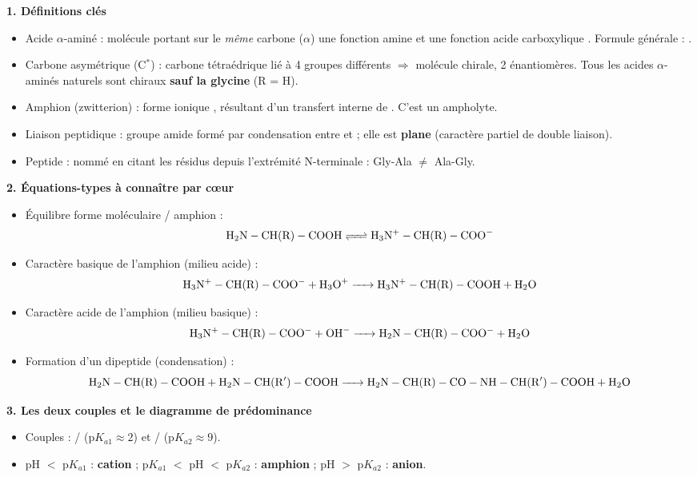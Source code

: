 \documentclass[11pt]{article}
\newcommand{\cle}[1]{{\popxbold\color{popdark}#1}}
\begin{document}
\begin{bilan}
\textbf{1. Définitions clés}
\begin{itemize}
  \item \cle{Acide $\alpha$-aminé} : molécule portant sur le \emph{même} carbone ($\alpha$) une fonction amine  et une fonction acide carboxylique . Formule générale : .
  \item \cle{Carbone asymétrique} (C$^*$) : carbone tétraédrique lié à 4 groupes différents $\Rightarrow$ molécule chirale, 2 énantiomères. Tous les acides $\alpha$-aminés naturels sont chiraux \textbf{sauf la glycine} (R = H).
  \item \cle{Amphion} (zwitterion) : forme ionique , résultant d'un transfert interne de . C'est un \cle{ampholyte}.
  \item \cle{Liaison peptidique} : groupe amide  formé par condensation entre  et  ; elle est \textbf{plane} (caractère partiel de double liaison).
  \item \cle{Peptide} : nommé en citant les résidus depuis l'extrémité N-terminale : Gly-Ala $\neq$ Ala-Gly.
\end{itemize}

\textbf{2. Équations-types à connaître par c\oe ur}
\begin{itemize}
  \item Équilibre forme moléculaire / amphion :
  \[ \mathrm{H_2N-CH(R)-COOH} \ce{<=>} \mathrm{H_3N^+-CH(R)-COO^-} \]
  \item Caractère basique de l'amphion (milieu acide) :
  \[ \mathrm{H_3N^+-CH(R)-COO^-} + \ce{H3O+} \ce{->} \mathrm{H_3N^+-CH(R)-COOH} + \ce{H2O} \]
  \item Caractère acide de l'amphion (milieu basique) :
  \[ \mathrm{H_3N^+-CH(R)-COO^-} + \ce{OH-} \ce{->} \mathrm{H_2N-CH(R)-COO^-} + \ce{H2O} \]
  \item Formation d'un dipeptide (condensation) :
  \[ \mathrm{H_2N-CH(R)-COOH} + \mathrm{H_2N-CH(R')-COOH} \ce{->} \mathrm{H_2N-CH(R)-CO-NH-CH(R')-COOH} + \ce{H2O} \]
\end{itemize}

\textbf{3. Les deux couples et le diagramme de prédominance}
\begin{itemize}
  \item Couples : / (p$K_{a1} \approx 2$) et / (p$K_{a2} \approx 9$).
  \item pH $<$ p$K_{a1}$ : \textbf{cation} ; p$K_{a1}$ $<$ pH $<$ p$K_{a2}$ : \textbf{amphion} ; pH $>$ p$K_{a2}$ : \textbf{anion}.
\end{itemize}


\end{bilan}
\end{document}
